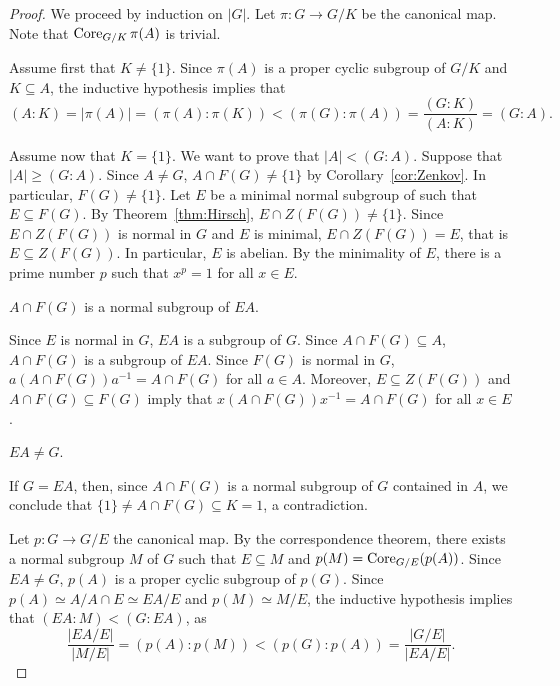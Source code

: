 \begin{proof}
	We proceed by induction on $|G|$. Let $\pi\colon G\to G/K$ be the canonical map. Note that $\operatorname{Core}_{G/K}\pi(A)$ is trivial. 

	Assume first that $K\ne\{1\}$. Since $\pi(A)$ is a proper cyclic subgroup of 
	$G/K$ and $K\subseteq A$, the inductive hypothesis implies that 
	\[
		(A:K)=|\pi(A)|=(\pi(A):\pi(K))<(\pi(G):\pi(A))=\frac{(G:K)}{(A:K)}=(G:A).
	\]

	Assume now that $K=\{1\}$. We want to prove that $|A|<(G:A)$. Suppose that 
	$|A|\geq (G:A)$. Since $A\ne G$, $A\cap F(G)\ne\{1\}$ by Corollary~\ref{cor:Zenkov}. In particular, $F(G)\ne\{1\}$. Let $E$ be a minimal normal subgroup of 
	such that $E\subseteq F(G)$. By Theorem~\ref{thm:Hirsch}, $E\cap Z(F(G))\ne\{1\}$.  Since 
	$E\cap Z(F(G))$ is normal in $G$ and $E$ is minimal, $E\cap Z(F(G))=E$, that is 
	$E\subseteq Z(F(G))$. In particular, $E$ is abelian. By the minimality of 
	$E$, there is a prime number $p$ such that $x^p=1$ for all $x\in E$. 

	\begin{claim}
		$A\cap F(G)$ is a normal subgroup of $EA$.
	\end{claim}

	Since $E$ is normal in $G$, $EA$ is a subgroup of $G$. Since $A\cap
	F(G)\subseteq A$, $A\cap F(G)$ is a subgroup of $EA$.  Since $F(G)$ is 
	normal in $G$, $a(A\cap F(G))a^{-1}=A\cap F(G)$ for all $a\in A$. Moreover, 
    $E\subseteq Z(F(G))$ and $A\cap F(G)\subseteq F(G)$ imply that 
	$x(A\cap F(G))x^{-1}=A\cap F(G)$ for all $x\in E$. 

	\begin{claim}
		$EA\ne G$.
	\end{claim}

	If $G=EA$, then, since $A\cap F(G)$ is a normal subgroup of $G$
	contained in $A$, we conclude that $\{1\}\ne A\cap F(G)\subseteq K=1$, a 
	contradiction. 

	\medskip
	Let $p\colon G\to G/E$ the canonical map. By the correspondence theorem,
	there exists a normal subgroup $M$ of $G$ such that $E\subseteq M$ and 
	$p(M)=\operatorname{Core}_{G/E}(p(A))$. Since $EA\ne G$, $p(A)$ is a proper cyclic subgroup 
	of $p(G)$. Since $p(A)\simeq A/A\cap E\simeq EA/E$ and $p(M)\simeq
	M/E$, the inductive hypothesis implies that 
	$(EA:M)<(G:EA)$, as 
	\[
	\frac{|EA/E|}{|M/E|}
	=(p(A):p(M))
	<(p(G):p(A))
	=\frac{|G/E|}{|EA/E|}.
	\]


\end{proof}
